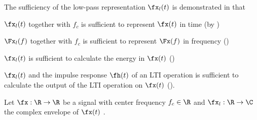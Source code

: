 The sufficiency of the low-pass representation $\fx_l(t)$
is demonstrated in that
\begin{enume}
   \item $\fx_l(t)$ together with $f_c$ is sufficient to represent
         $\fx(t)$ in time (by )
   \item $\Fx_l(f)$ together with $f_c$ is sufficient to represent
         $\Fx(f)$ in frequency ()
   \item $\fx_l(t)$ is sufficient to calculate the energy in $\fx(t)$
         ()
   \item $\fx_l(t)$ and the impulse response $\fh(t)$ of an LTI operation
         is sufficient to calculate the output of the LTI operation
         on $\fx(t)$ ().
\end{enume}
\begin{theorem}
\label{thm:xxl}
Let $\fx:\R\to\R$ be a signal with center frequency $f_c\in\R$
and $\fx_l:\R\to\C$ the complex envelope of $\fx(t)$ .
\end{theorem}
